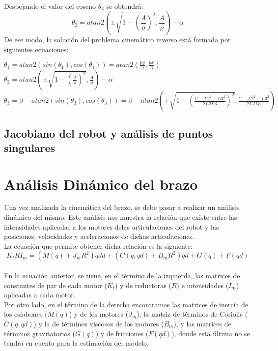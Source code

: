 	Despejando el valor del coseno $\theta_{3}$ se obtendrá:
	\begin{equation}
	\theta_{2}=atan2(\pm \sqrt{1-(\frac{A}{\rho})^{2}},\frac{A}{\rho})-\alpha
	\end{equation}
	De ese modo, la solución del problema cinemático inverso está formada por siguientes ecuaciones:
	\begin{center}
		$\theta_{1}=atan2(sin(\theta_{1}),cos(\theta_{1}))=atan2(\frac{py}{A},\frac{px}{A})$ \\
		$\theta_{2}=atan2(\pm \sqrt{1-(\frac{A}{\rho})^{2}},\frac{A}{\rho})-\alpha$ \\
		$\theta_{3}=\beta -atan2(sin(\theta_{3}),cos(\theta_{3}))=\beta-atan2(\pm \sqrt{1-(\frac{C-L2^{2}-L3^{2}}{2L2L3})^{2}},\frac{C-L2^{2}-L3^{2}}{2L2L3} )$
	\end{center}
	\subsection{Jacobiano del robot y análisis de puntos singulares}
	
\section{Análisis Dinámico del brazo}
Una vez analizada la cinemática del brazo, se debe pasar a realizar un análisis dinámico del mismo. Este análisis nos muestra la relación que existe entre las intensidades aplicadas a los motores delas articulaciones del robot y las posiciones, velocidades y aceleraciones de dichas articulaciones.\\

La ecuación que permite obtener dicha relación es la siguiente:\\

	\begin{equation}
	K_tRI_m=(M(q)+J_mR^2)qdd+(C(q,qd)+B_mR^2)qd+G(q)+F(qd)
	\end{equation}\\
	
En la ecuación anterior, se tiene, en el término de la izquierda, las matrices de constantes de par de cada motor ($K_t$) y de reductoras ($R$) e intensidades ($I_m$) aplicadas a cada motor.\\

Por otro lado, en el término de la derecha encontramos las matrices de inercia de los eslabones ($M(q)$) y de los motores ($J_m$), la matriz de términos de Coriolis ($C(q,qd)$) y la de términos viscosos de los motores ($B_m$), y las matrices de términos gravitatorios ($G(q)$) y de fricciones ($F(qd)$), donde esta última no se tendrá en cuenta para la estimación del modelo.\\

